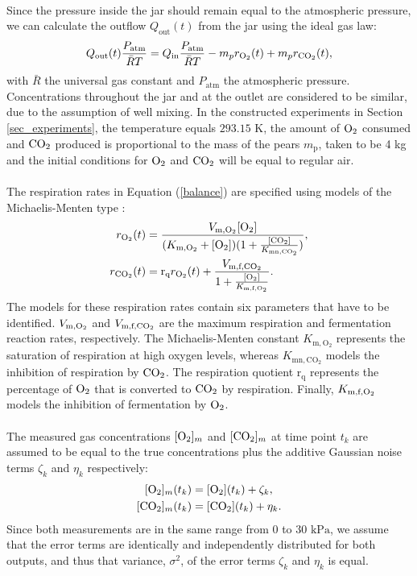 \\
Since the pressure inside the jar should remain equal to the atmospheric pressure, we can calculate the outflow $Q_\text{out}(t)$ from the jar using the ideal gas law:
\begin{equation}
Q_{\text{out}}(t)\frac{P_\text{atm}}{\bar{R}T} = Q_{\text{in}}\frac{P_\text{atm}}{\bar{R}T} - m_p r_{\text{O}_2}(t) + m_p r_{\text{CO}_2}(t),
\label{balance}
\end{equation}
with $\bar{R}$ the universal gas constant and $P_\text{atm}$ the atmospheric pressure. Concentrations throughout the jar and at the outlet are considered to be similar, due to the assumption of well mixing. In the constructed experiments in Section \ref{sec_experiments}, the temperature equals $293.15$ K,  the amount of $\text{O}_2$ consumed and $\text{CO}_2$ produced is proportional to the mass of the pears $m_\text{p}$, taken to be 4 kg and the initial conditions for $\text{O}_2$ and $\text{CO}_2$ will be equal to regular air.
\\
\\
The respiration rates in Equation (\ref{balance}) are specified using models of the Michaelis-Menten type \parencite{hertog}:
\begin{equation}
\begin{aligned}
r_{\text{O}_2}(t) &= 
\frac{V_{\text{m},\text{O}_2}[\text{O}_2]}
{(K_{\text{m},\text{O}_2} + [\text{O}_2])
	(1 + \frac{[\text{CO}_2]}{K_{\text{mn},\text{CO}_2}})},\\
r_{\text{CO}_2}(t) &= 
\text{r}_\text{q}r_{\text{O}_2}(t) + 
\frac{V_{\text{m,f,}\text{CO}_2}}
{1 + \frac{[\text{O}_2]}{K_{\text{m,f},\text{O}_2}}}.
\end{aligned}
\end{equation}
The models for these respiration rates contain six parameters that have to be identified. $V_{\text{m},\text{O}_2}$ and $V_{\text{m,f,}\text{CO}_2}$ are the maximum respiration and fermentation reaction rates, respectively. The Michaelis-Menten constant $K_{\text{m},\text{O}_2}$ represents the saturation of respiration at high oxygen levels, whereas $K_{\text{mn},\text{CO}_2}$ models the inhibition of respiration by $\text{CO}_2$. The respiration quotient $\text{r}_\text{q}$ represents the percentage of $\text{O}_2$ that is converted to $\text{CO}_2$ by respiration. Finally, $K_{\text{m,f},\text{O}_2}$ models the inhibition of fermentation by $\text{O}_2$.
\\
\\
The measured gas concentrations $[\text{O}_2]_m$ and $[\text{CO}_2]_m$ at time point $t_k$ are assumed to be equal to the true concentrations plus the additive Gaussian noise terms $\zeta_k$ and $\eta_k$ respectively:
\begin{equation}
\begin{aligned}
\Coxy_{m}(t_k) &= \Coxy(t_k) + \zeta_k,\\
\Ccoxy_{m}(t_k) &= \Ccoxy(t_k) + \eta_k.
\end{aligned}
\end{equation}
Since both measurements are in the same range from $0$ to $30\text{ kPa}$, we assume that the error terms are identically and independently distributed for both outputs, and thus that variance, $\sigma^2$, of the error terms $\zeta_k$ and $\eta_k$ is equal.
